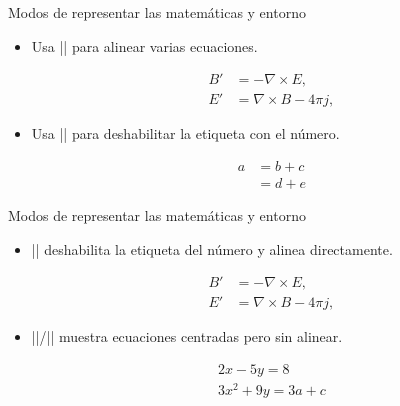 \begin{frame}[fragile]{Modos de representar las matemáticas y entorno}
  \begin{itemize}
    \item Usa \latexinline|\align| para alinear varias ecuaciones.
          \begin{latexexample}
            \begin{align}
              B' &=-\nabla \times E, \\
              E' &=\nabla \times B - 4\pi j,
            \end{align}
          \end{latexexample}
    \item Usa \latexinline|\nonumber| para deshabilitar la etiqueta con el número.
          \begin{latexexample}
            \begin{align}
              a &= b + c \nonumber \\
                &= d + e
            \end{align}
          \end{latexexample}
  \end{itemize}
\end{frame}

\begin{frame}[fragile]{Modos de representar las matemáticas y entorno}
  \begin{itemize}
    \item \latexinline|\align*| deshabilita la etiqueta del número y alinea directamente.
          \begin{latexexample}
            \begin{align*}
              B' &=-\nabla \times E, \\
              E' &=\nabla \times B - 4\pi j,
            \end{align*}
          \end{latexexample}
    \item \latexinline|\gather|/\latexinline|\gather*| muestra ecuaciones centradas pero sin alinear.
          \begin{latexexample}
            \begin{gather*}
              2x - 5y =  8 \\
              3x^2 + 9y =  3a + c
            \end{gather*}
          \end{latexexample}
  \end{itemize}
\end{frame}

